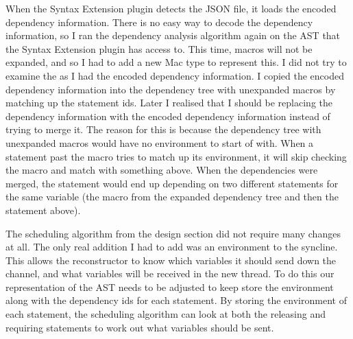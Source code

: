 When the Syntax Extension plugin detects the JSON file, it loads the encoded dependency information. There is no easy way to decode the dependency information, so I ran the dependency analysis algorithm again on the AST that the Syntax Extension plugin has access to. This time, macros will not be expanded, and so I had to add a new Mac type to represent this. I did not try to examine the  as I had the encoded dependency information. I copied the encoded dependency information into the dependency tree with unexpanded macros by matching up the statement ids. Later I realised that I should be replacing the dependency information with the encoded dependency information instead of trying to merge it. The reason for this is because the dependency tree with unexpanded macros would have no environment to start of with. When a statement past the macro tries to match up its environment, it will skip checking the macro and match with something above. When the dependencies were merged, the statement would end up depending on two different statements for the same variable (the macro from the expanded dependency tree and then the statement above).

The scheduling algorithm from the design section did not require many changes at all. The only real addition I had to add was an environment to the syncline. This allows the reconstructor to know which variables it should send down the channel, and what variables will be received in the new thread.
To do this our representation of the AST needs to be adjusted to keep store the environment along with the dependency ids for each statement. By storing the environment of each statement, the scheduling algorithm can look at both the releasing and requiring statements to work out what variables should be sent.


